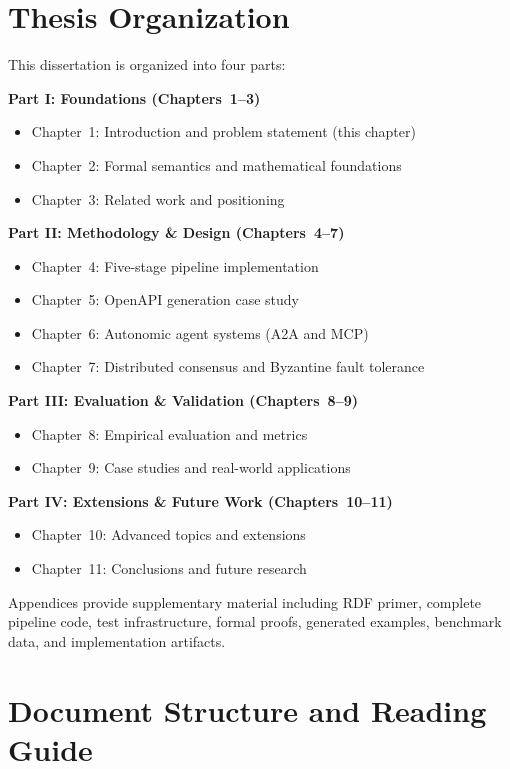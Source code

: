\section{Thesis Organization}

This dissertation is organized into four parts:

\textbf{Part I: Foundations (Chapters~1--3)}
\begin{itemize}
    \item Chapter~1: Introduction and problem statement (this chapter)
    \item Chapter~2: Formal semantics and mathematical foundations
    \item Chapter~3: Related work and positioning
\end{itemize}

\textbf{Part II: Methodology \& Design (Chapters~4--7)}
\begin{itemize}
    \item Chapter~4: Five-stage pipeline implementation
    \item Chapter~5: OpenAPI generation case study
    \item Chapter~6: Autonomic agent systems (A2A and MCP)
    \item Chapter~7: Distributed consensus and Byzantine fault tolerance
\end{itemize}

\textbf{Part III: Evaluation \& Validation (Chapters~8--9)}
\begin{itemize}
    \item Chapter~8: Empirical evaluation and metrics
    \item Chapter~9: Case studies and real-world applications
\end{itemize}

\textbf{Part IV: Extensions \& Future Work (Chapters~10--11)}
\begin{itemize}
    \item Chapter~10: Advanced topics and extensions
    \item Chapter~11: Conclusions and future research
\end{itemize}

Appendices provide supplementary material including RDF primer, complete pipeline code, test infrastructure, formal proofs, generated examples, benchmark data, and implementation artifacts.

\section{Document Structure and Reading Guide}

